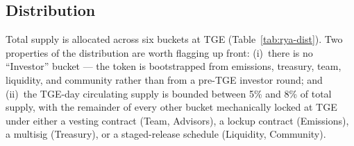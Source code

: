 \documentclass[11pt,a4paper]{article}
\begin{document}
\subsection{Distribution}\label{sec:economics:rya:dist}

Total supply is allocated across six buckets at TGE
(Table~\ref{tab:rya-dist}). Two properties of the distribution are worth flagging up
front: (i)~there is no ``Investor'' bucket --- the token is bootstrapped from
emissions, treasury, team, liquidity, and community rather than from a pre-TGE
investor round; and (ii)~the TGE-day circulating supply is bounded between 5\% and
8\% of total supply, with the remainder of every other bucket mechanically locked
at TGE under either a vesting contract (Team, Advisors), a lockup contract
(Emissions), a multisig (Treasury), or a staged-release schedule
(Liquidity, Community).
\end{document}
